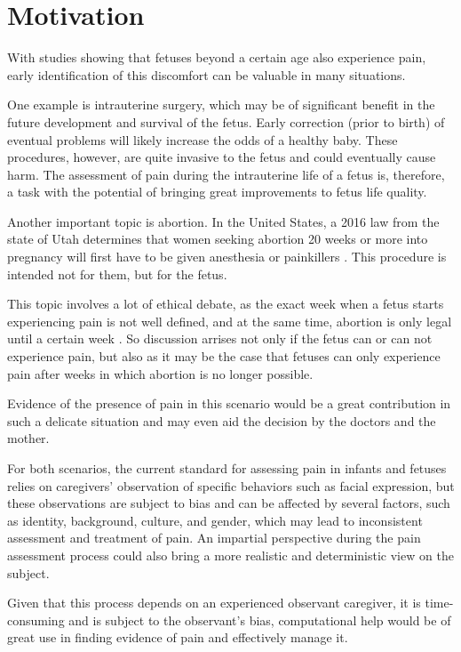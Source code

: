 \documentclass[msc]{ppgccufmg}
\begin{document}
\section{Motivation}

With studies showing that fetuses beyond a certain age also experience pain, early identification of this discomfort can be valuable in many situations.

One example is intrauterine surgery, which may be of significant benefit in the future development and survival of the fetus. Early correction (prior to birth) of eventual problems will likely increase the odds of a healthy baby. These procedures, however, are quite invasive to the fetus and could eventually cause harm. The assessment of pain during the intrauterine life of a fetus is, therefore, a task with the potential of bringing great improvements to fetus life quality. 

Another important topic is abortion. In the United States, a 2016 law from the state of Utah determines that women seeking abortion 20 weeks or more into pregnancy will first have to be given anesthesia or painkillers \citep{healy2016nytimes}. This procedure is intended not for them, but for the fetus. 

This topic involves a lot of ethical debate, as the exact week when a fetus starts experiencing pain is not well defined, and at the same time, abortion is only legal until a certain week \citep{Derbyshire2006}. So discussion arrises not only if the fetus can or can not experience pain, but also as it may be the case that fetuses can only experience pain after weeks in which abortion is no longer possible.

Evidence of the presence of pain in this scenario would be a great contribution in such a delicate situation and may even aid the decision by the doctors and the mother.

For both scenarios, the current standard for assessing pain in infants and fetuses relies on caregivers’ observation of specific behaviors such as facial expression, but these observations are subject to bias and can be affected by several factors, such as identity, background, culture, and gender, which may lead to inconsistent assessment and treatment of pain. An impartial perspective during the pain assessment process could also bring a more realistic and deterministic view on the subject.

Given that this process depends on an experienced observant caregiver, it is time-consuming and is subject to the observant's bias, computational help would be of great use in finding evidence of pain and effectively manage it.
\end{document}
